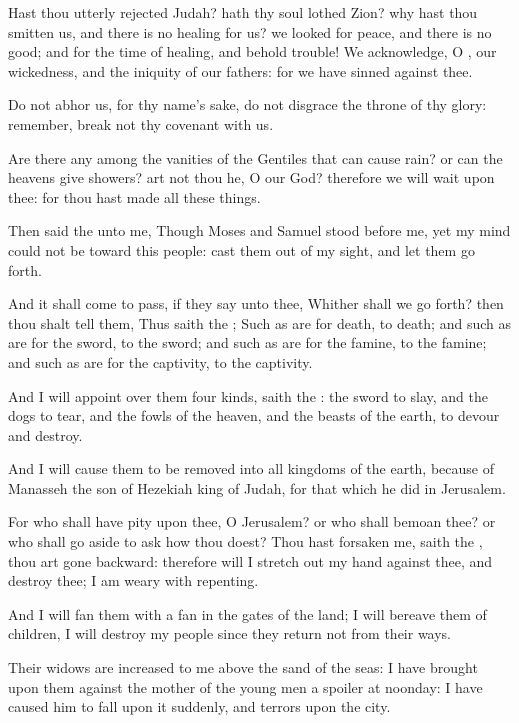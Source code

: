 \Verse Hast thou utterly rejected Judah? hath thy soul lothed Zion? why hast thou smitten us, and there is no healing for us? we looked for peace, and there is no good; and for the time of healing, and behold trouble!  \Verse We acknowledge, O \LORD, our wickedness, and the iniquity of our fathers: for we have sinned against thee.

\Verse Do not abhor us, for thy name's sake, do not disgrace the throne of thy glory: remember, break not thy covenant with us.

\Verse Are there any among the vanities of the Gentiles that can cause rain? or can the heavens give showers? art not thou he, O \LORD our God?  therefore we will wait upon thee: for thou hast made all these things.


\Chapter
\Verse Then said the \LORD unto me, Though Moses and Samuel stood before me, yet my mind could not be toward this people: cast them out of my sight, and let them go forth.

\Verse And it shall come to pass, if they say unto thee, Whither shall we go forth? then thou shalt tell them, Thus saith the \LORD; Such as are for death, to death; and such as are for the sword, to the sword; and such as are for the famine, to the famine; and such as are for the captivity, to the captivity.

\Verse And I will appoint over them four kinds, saith the \LORD: the sword to slay, and the dogs to tear, and the fowls of the heaven, and the beasts of the earth, to devour and destroy.

\Verse And I will cause them to be removed into all kingdoms of the earth, because of Manasseh the son of Hezekiah king of Judah, for that which he did in Jerusalem.

\Verse For who shall have pity upon thee, O Jerusalem? or who shall bemoan thee? or who shall go aside to ask how thou doest?  \Verse Thou hast forsaken me, saith the \LORD, thou art gone backward: therefore will I stretch out my hand against thee, and destroy thee; I am weary with repenting.

\Verse And I will fan them with a fan in the gates of the land; I will bereave them of children, I will destroy my people since they return not from their ways.

\Verse Their widows are increased to me above the sand of the seas: I have brought upon them against the mother of the young men a spoiler at noonday: I have caused him to fall upon it suddenly, and terrors upon the city.

